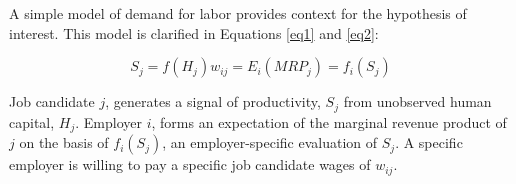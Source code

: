 \documentclass[review]{elsarticle}
\begin{document}

A simple model of demand for labor provides context for the hypothesis of interest.
This model is clarified in Equations \ref{eq1} and \ref{eq2}:

\begin{subequations}
    \begin{equation}
        S_j = f(H_j)
        \label{eq1}
    \end{equation}
    \begin{equation}
        w_{ij} = E_i(MRP_j) = f_i(S_j)
        \label{eq2}
    \end{equation}
\end{subequations}

Job candidate $j$, generates a signal of productivity, $S_j$ from unobserved human capital, $H_j$.
Employer $i$, forms an expectation of the marginal revenue product of $j$ on the basis of $f_i(S_j)$, an employer-specific evaluation of $S_j$.
A specific employer is willing to pay a specific job candidate wages of $w_{ij}$.
\end{document}

